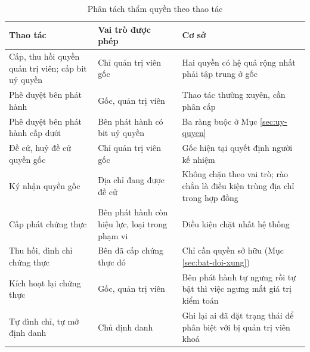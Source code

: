 \begin{table}[H]
\centering
\caption{Phân tách thẩm quyền theo thao tác}
\label{tab:v2-role}
\renewcommand{\arraystretch}{1.2}
\small
\begin{tabular}{|p{4.4cm}|p{3.4cm}|p{5.6cm}|}
\hline
\textbf{Thao tác} & \textbf{Vai trò được phép} & \textbf{Cơ sở} \\ \hline
Cấp, thu hồi quyền quản trị viên; cấp bit uỷ quyền & Chỉ quản trị viên gốc & Hai quyền có hệ quả rộng nhất phải tập trung ở gốc \\ \hline
Phê duyệt bên phát hành & Gốc, quản trị viên & Thao tác thường xuyên, cần phân cấp \\ \hline
Phê duyệt bên phát hành cấp dưới & Bên phát hành có bit uỷ quyền & Ba ràng buộc ở Mục \ref{sec:uy-quyen} \\ \hline
Đề cử, huỷ đề cử quyền gốc & Chỉ quản trị viên gốc & Gốc hiện tại quyết định người kế nhiệm \\ \hline
Ký nhận quyền gốc & Địa chỉ đang được đề cử & Không chặn theo vai trò; rào chắn là điều kiện trùng địa chỉ trong hợp đồng \\ \hline
Cấp phát chứng thực & Bên phát hành còn hiệu lực, loại trong phạm vi & Điều kiện chặt nhất hệ thống \\ \hline
Thu hồi, đình chỉ chứng thực & Bên đã cấp chứng thực đó & Chỉ cần quyền sở hữu (Mục \ref{sec:bat-doi-xung}) \\ \hline
Kích hoạt lại chứng thực & Gốc, quản trị viên & Bên phát hành tự ngưng rồi tự bật thì việc ngưng mất giá trị kiểm toán \\ \hline
Tự đình chỉ, tự mở định danh & Chủ định danh & Ghi lại ai đã đặt trạng thái để phân biệt với bị quản trị viên khoá \\ \hline
\end{tabular}
\end{table}
